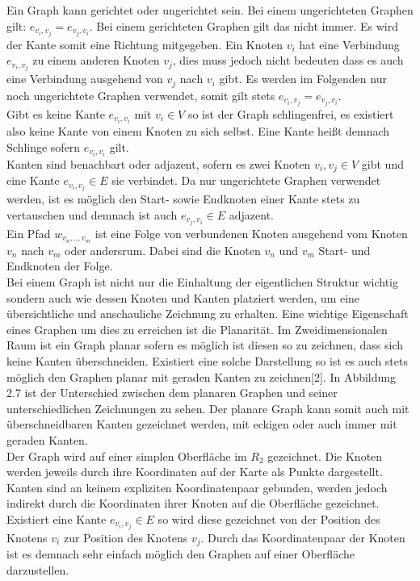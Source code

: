 Ein Graph kann gerichtet oder ungerichtet sein. Bei einem ungerichteten Graphen gilt: $e_{v_{i},v_{j}} = e_{v_{j},v_{i}}$. Bei einem gerichteten Graphen gilt das nicht immer. Es wird der Kante somit eine Richtung mitgegeben. Ein Knoten $v_{i}$ hat eine Verbindung $e_{v_{i},v_{j}}$ zu einem anderen Knoten $v_{j}$, dies muss jedoch nicht bedeuten dass es auch eine Verbindung ausgehend von $v_{j}$ nach $v_{i}$ gibt. Es werden im Folgenden nur noch ungerichtete Graphen verwendet, somit gilt stets  $e_{v_{i},v_{j}} = e_{v_{j},v_{i}}$.\\

Gibt es keine Kante $e_{v_{i},v_{i}}$ mit $v_{i} \in V$ so ist der Graph schlingenfrei, es existiert also keine Kante von einem Knoten zu sich selbst. Eine Kante heißt demnach Schlinge sofern $e_{v_{i},v_{i}}$ gilt. \\

Kanten sind benachbart oder adjazent, sofern es zwei Knoten $v_{i},v_{j} \in V$ gibt und eine Kante $e_{v_{i},v_{j}} \in E$ sie verbindet. Da nur ungerichtete Graphen verwendet werden, ist es möglich den Start- sowie Endknoten einer Kante stets zu vertauschen und demnach ist auch $e_{v_{j},v_{i}} \in E$ adjazent. \\

Ein Pfad $w_{v_{n}, .., v_{m}}$ ist eine Folge von verbundenen Knoten ausgehend vom Knoten $v_{n}$ nach $v_{m}$ oder andersrum. Dabei sind die Knoten $v_{n}$ und $v_{m}$ Start- und Endknoten der Folge.    \\

Bei einem Graph ist nicht nur die Einhaltung der eigentlichen Struktur wichtig sondern auch wie dessen Knoten und Kanten platziert werden, um eine übersichtliche und anschauliche Zeichnung zu erhalten. Eine wichtige Eigenschaft eines Graphen um dies zu erreichen ist die Planarität. Im Zweidimensionalen Raum ist ein Graph planar sofern es möglich ist diesen so zu zeichnen, dass sich keine Kanten überschneiden. Existiert eine solche Darstellung so ist es auch stets möglich den Graphen planar mit geraden Kanten zu zeichnen[2]. In Abbildung 2.7 ist der Unterschied zwischen dem planaren Graphen und seiner unterschiedlichen Zeichnungen zu sehen. Der planare Graph kann somit auch mit überschneidbaren Kanten gezeichnet werden, mit eckigen oder auch immer mit geraden Kanten. \\


Der Graph wird auf einer simplen Oberfläche im $R_{2}$ gezeichnet. Die Knoten werden jeweils durch ihre Koordinaten auf der Karte als Punkte dargestellt. Kanten sind an keinem expliziten Koordinatenpaar gebunden, werden jedoch indirekt durch die Koordinaten ihrer Knoten auf die Oberfläche gezeichnet. Existiert eine Kante $e_{v_{i},v_{j}} \in E$ so wird diese gezeichnet von der Position des Knotens $v_{i}$ zur Position des Knotens $v_{j}$. Durch das Koordinatenpaar der Knoten ist es demnach sehr einfach möglich den Graphen auf einer Oberfläche darzustellen. 


